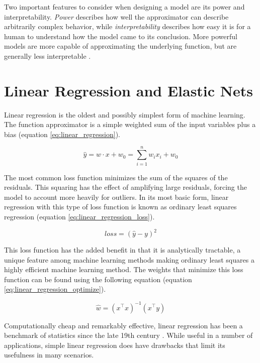 Two important features to consider when designing a model are its power and interpretability. \textit{Power} describes how well the approximator can describe arbitrarily complex behavior, while \textit{interpretability} describes how easy it is for a human to understand how the model came to its conclusion. More powerful models are more capable of approximating the underlying function, but are generally less interpretable \citep{Du2018TechniquesLearning}. 

\section{Linear Regression and Elastic Nets}

Linear regression is the oldest and possibly simplest form of machine learning. The function approximator is a simple weighted sum of the input variables plus a bias (equation \ref{eq:linear_regression}).

\begin{equation}
    \label{eq:linear_regression}
    \hat{y} = w \cdot x + w_0 = \sum_{i=1} ^ {n} {w_i x_i} + w_0
\end{equation}

The most common loss function minimizes the sum of the squares of the residuals. This squaring has the effect of amplifying large residuals, forcing the model to account more heavily for outliers. In its most basic form, linear regression with this type of loss function is known as ordinary least squares regression (equation \ref{eq:linear_regression_loss}). 

\begin{equation}
    \label{eq:linear_regression_loss}
    loss = (\hat{y} - y) ^ 2
\end{equation}

This loss function has the added benefit in that it is analytically tractable, a unique feature among machine learning methods making ordinary least squares a highly efficient machine learning method. The weights that minimize this loss function can be found using the following equation (equation \ref{eq:linear_regression_optimize}).

\begin{equation}
    \label{eq:linear_regression_optimize}
    \hat{w} = (x^\top x) ^ {-1} (x^\top y)
\end{equation}

Computationally cheap and remarkably effective, linear regression has been a benchmark of statistics since the late 19th century \citep{Galton1886RegressionStature.}. While useful in a number of applications, simple linear regression does have drawbacks that limit its usefulness in many scenarios.

